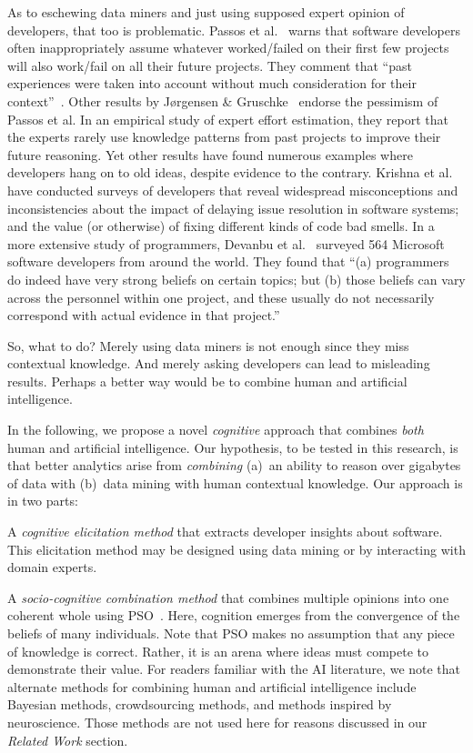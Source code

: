 
As to eschewing data miners and just using supposed   expert opinion of
developers, that  too  is  problematic.
 Passos et al.~\cite{Pa11} warns that software developers often inappropriately assume whatever worked/failed on their first few projects will also work/fail on all their future projects. They comment  that ``past experiences were taken into account without much consideration for their context''~\cite{Pa11}. 
Other  results by J\o rgensen \& Gruschke~\cite{Jo09} endorse the pessimism of Passos et al. In an empirical study of expert effort estimation, they report that the experts rarely use knowledge patterns from past projects to improve their future reasoning.  
Yet other results have found numerous examples where developers hang on to old ideas, despite evidence to the contrary.
Krishna et al.~\cite{Me17,Kr16}    have conducted   surveys of developers that
  reveal widespread misconceptions and inconsistencies
about the impact of delaying issue resolution in software systems;
and the value (or otherwise) of fixing different kinds of code bad smells.
In a more extensive study of programmers, Devanbu et al.~\cite{De16} surveyed 564 Microsoft software developers from around the world. They found that ``(a) programmers do indeed have very strong beliefs on certain topics; but (b) those beliefs can vary across the personnel within one project, and these usually do not necessarily correspond with actual evidence in that project.'' 

So, what to do? Merely using data miners is not enough since they miss contextual knowledge. And merely
asking developers can lead to misleading results. Perhaps a better way would be to combine human and artificial intelligence.



In the following, we propose a novel
{\em cognitive} approach that  combines {\em both}   human and artificial intelligence. Our hypothesis, to be tested in this research, is that better analytics 
arise  from {\em combining}
  (a)~an ability to reason over gigabytes of data
 with (b)~data mining with human contextual knowledge. Our approach is in two parts: 
\bi
\item A {\em cognitive elicitation method} that extracts developer insights 
about software. This elicitation method may be designed using data mining or by interacting with domain experts. 
\item A {\em socio-cognitive combination method}  that  combines multiple opinions into one coherent whole using  PSO~\cite{Eb95,banks2008review,banks2007review}. Here,  cognition 
 emerges from the convergence of the beliefs of many individuals. Note that PSO makes no
 assumption that any piece of knowledge is correct. Rather, it is an arena 
 where ideas must  compete to demonstrate their value.
\ei
For readers familiar with the AI literature, we note that alternate methods for combining human and artificial intelligence include Bayesian methods, 
crowdsourcing methods, and 
methods inspired by neuroscience. Those methods are not used here for reasons discussed in our {\em Related Work} section.

